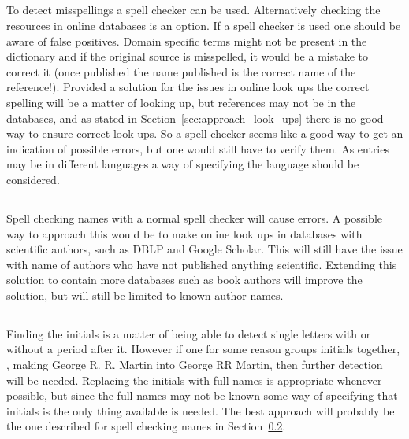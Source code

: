 \subsection{}

To detect misspellings a spell checker can be used.  Alternatively
checking the resources in online databases is an option.  If a spell
checker is used one should be aware of false positives.  Domain
specific terms might not be present in the dictionary and if the
original source is misspelled, it would be a mistake to correct it
(once published the name published is the correct name of the
reference!).  Provided a solution for the issues in online look ups
the correct spelling will be a matter of looking up, but references
may not be in the databases, and as stated in
Section~\ref{sec:approach_look_ups} there is no good way to ensure
correct look ups.  So a spell checker seems like a good way to get an
indication of possible errors, but one would still have to verify
them.  As entries may be in different languages a way of specifying
the language should be considered.


\subsection{}
\label{sec:approach_spelling_names}

Spell checking names with a normal spell checker will cause errors.  A
possible way to approach this would be to make online look ups in
databases with scientific authors, such as DBLP and Google Scholar.
This will still have the issue with name of authors who have not
published anything scientific.  Extending this solution to contain
more databases such as book authors will improve the solution, but
will still be limited to known author names.


\subsection{}

Finding the initials is a matter of being able to detect single
letters with or without a period after it.  However if one for some
reason groups initials together, \eg, making George R. R. Martin into
George RR Martin, then further detection will be needed.  Replacing
the initials with full names is appropriate whenever possible, but
since the full names may not be known some way of specifying that
initials is the only thing available is needed.  The best approach
will probably be the one described for spell checking names in
Section~\ref{sec:approach_spelling_names}.


